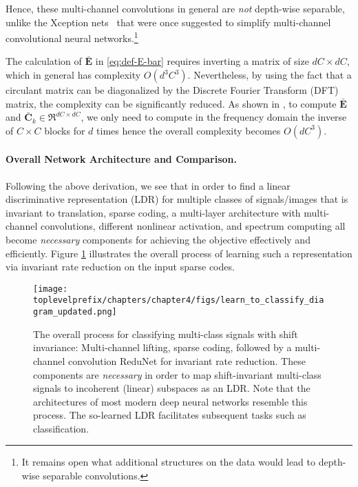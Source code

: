 \documentclass[\toplevelprefix/book-main.tex]{subfiles}
\begin{document}
Hence, these multi-channel convolutions in general are {\em not} depth-wise separable, unlike the  Xception nets~\cite{Xception} that were once suggested to simplify multi-channel convolutional neural networks.\footnote{It remains open what additional structures on the data would lead to depth-wise separable convolutions.} 

\begin{remark} 
The calculation of $\bar{\bm E}$ in \eqref{eq:def-E-bar} requires inverting a matrix of size $dC \times dC$, which in general has complexity $O(d^3C^3)$.  Nevertheless, by using the fact that a circulant matrix can be diagonalized by the Discrete Fourier Transform (DFT) matrix, the complexity can be significantly reduced. As shown in \cite{chan2021redunet}, to compute $\bar{\bm E}$ and $\bar{\bm C}_k \in \Re^{dC \times dC}$, we only need to compute in the frequency domain the inverse of $C\times C$ blocks for $d$ times hence the overall complexity becomes $O(dC^3)$.
    
\end{remark}




\paragraph{Overall Network Architecture and Comparison.} 
Following the above derivation, we see that in order to find a linear discriminative representation (LDR)  for multiple classes of signals/images that is invariant to translation, sparse coding, a multi-layer architecture with multi-channel convolutions, different nonlinear activation, and spectrum computing all become {\em necessary} components for achieving the objective effectively and efficiently. Figure \ref{fig:learn-to-classify-diagram} illustrates the overall process of learning such a representation via invariant rate reduction on the input sparse codes. 

\begin{figure}[t]
    \centering
    \texttt{[image: \\toplevelprefix/chapters/chapter4/figs/learn\_to\_classify\_diagram\_updated.png]}
    \caption{The overall process for classifying multi-class signals with shift invariance: Multi-channel lifting,  sparse coding, followed by a multi-channel convolution ReduNet for invariant rate reduction. These components are {\em necessary} in order to map shift-invariant multi-class signals to incoherent (linear) subspaces as an LDR. Note that the architectures of most modern deep neural networks resemble this process. The so-learned LDR facilitates subsequent tasks such as classification.}
    \label{fig:learn-to-classify-diagram}
\end{figure}
\end{document}

